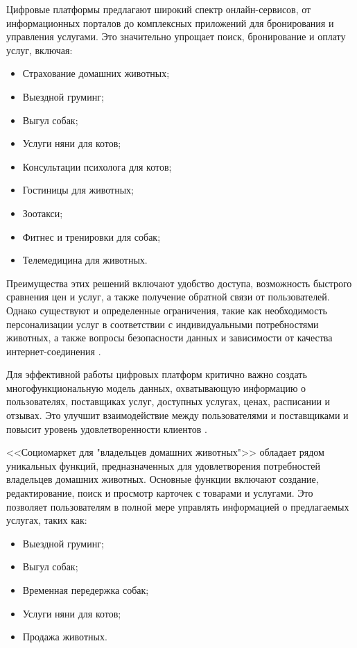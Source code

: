 Цифровые платформы предлагают широкий спектр онлайн-сервисов, от информационных порталов до комплексных приложений для бронирования и управления услугами. Это значительно упрощает поиск, бронирование и оплату услуг, включая:

\begin{itemize}
  \item Страхование домашних животных;
  \item Выездной груминг;
  \item Выгул собак;
  \item Услуги няни для котов;
  \item Консультации психолога для котов;
  \item Гостиницы для животных;
  \item Зоотакси;
  \item Фитнес и тренировки для собак;
  \item Телемедицина для животных.
\end{itemize}

Преимущества этих решений включают удобство доступа, возможность быстрого сравнения цен и услуг, а также получение обратной связи от пользователей. Однако существуют и определенные ограничения, такие как необходимость персонализации услуг в соответствии с индивидуальными потребностями животных, а также вопросы безопасности данных и зависимости от качества интернет-соединения \cite{market}.

Для эффективной работы цифровых платформ критично важно создать многофункциональную модель данных, охватывающую информацию о пользователях, поставщиках услуг, доступных услугах, ценах, расписании и отзывах. Это улучшит взаимодействие между пользователями и поставщиками и повысит уровень удовлетворенности клиентов \cite{freedman}.

<<Социомаркет для "владельцев домашних животных">> обладает рядом уникальных функций, предназначенных для удовлетворения потребностей владельцев домашних животных. Основные функции включают создание, редактирование, поиск и просмотр карточек с товарами и услугами. Это позволяет пользователям в полной мере управлять информацией о предлагаемых услугах, таких как:

\begin{itemize}
  \item Выездной груминг;
  \item Выгул собак;
  \item Временная передержка собак;
  \item Услуги няни для котов;
  \item Продажа животных.
\end{itemize}


